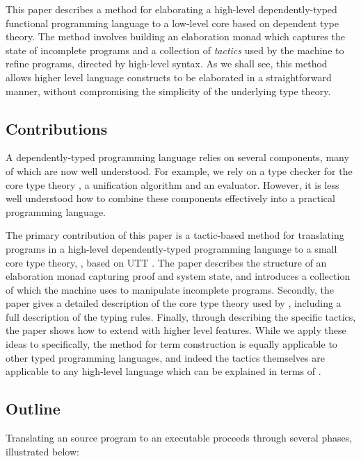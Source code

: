 This paper describes a method for elaborating a high-level dependently-typed
functional programming language to a low-level core based on dependent
type theory.  The method involves building an elaboration monad which captures
the state of incomplete programs and a collection of \emph{tactics} used by the
machine to refine programs, directed by high-level syntax.  As we shall see,
this method allows higher level language constructs to be elaborated in a
straightforward manner, without compromising the simplicity of the underlying
type theory.

\subsection{Contributions}

A dependently-typed programming language relies on several components, many of
which are now well understood. For example, we rely on a type checker for
the core type theory \cite{Chapman2005epigram,loh2010tutorial}, a
unification algorithm \cite{Miller1992} and an evaluator. However, it is less
well understood how to combine these components effectively into a practical
programming language. 

The primary contribution of this paper is a tactic-based method for translating
programs in a high-level dependently-typed programming language to a small core
type theory, \TT{}, based on UTT \cite{luo1994}. The paper describes the
structure of an elaboration monad capturing proof and system state, and
introduces a collection of  which the machine uses to
manipulate incomplete programs.  Secondly, the paper gives a detailed
description of the core type theory used by \Idris{}, including a full
description of the typing rules.  Finally, through describing the specific
tactics, the paper shows how to extend \Idris{} with higher level features.
While we apply these ideas to \Idris{} specifically, the method for term
construction is equally applicable to other typed programming languages, and
indeed the tactics themselves are applicable to any high-level language which
can be explained in terms of \TT{}.

\subsection{Outline}

Translating an \Idris{} source program to an executable proceeds through several
phases, illustrated below:

\begin{center}
\end{center}

